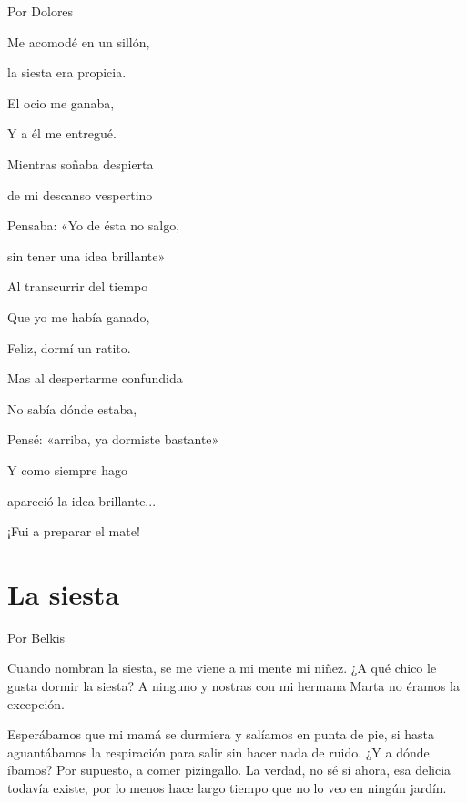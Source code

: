 \documentclass[11pt,twoside,openright,a5paper]{book}
\begin{document}
\begin{flushright}Por Dolores\end{flushright}

\begin{center}
Me acomodé en un sillón,

la siesta era propicia.

El ocio me ganaba,

Y a él me entregué.

\vspace{0.5cm}

Mientras soñaba despierta

de mi descanso vespertino

Pensaba: «Yo de ésta no salgo,

sin tener una idea brillante»

\vspace{0.5cm}

Al transcurrir del tiempo

Que yo me había ganado,

Feliz, dormí un ratito.

\vspace{0.5cm}

Mas al despertarme confundida

No sabía dónde estaba,

Pensé: «arriba, ya dormiste bastante»

Y como siempre hago

apareció la idea brillante...

¡Fui a preparar el mate!
\end{center}

\section*{La siesta}
                                                                                                             \begin{flushright}Por Belkis\end{flushright}

Cuando nombran la siesta, se me viene a mi mente mi niñez. ¿A qué chico le gusta dormir la siesta? A ninguno y nostras con mi hermana Marta no éramos la excepción.

Esperábamos que  mi mamá se durmiera y salíamos en punta de pie, si hasta aguantábamos la respiración para salir sin hacer nada de ruido. ¿Y a dónde íbamos? Por supuesto, a comer pizingallo. La verdad, no sé si ahora, esa delicia todavía existe, por lo menos hace largo tiempo que no lo veo en ningún jardín.
\end{document}
